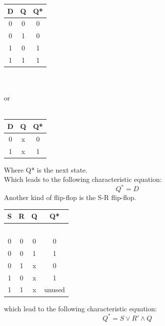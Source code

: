 \documentclass[nobib]{tufte-handout}
\begin{document}
    \begin{table}
        \centering
        \begin{tabular}{c c | c}
            D & Q & Q* \\
            \hline
            0 & 0 & 0  \\
            0 & 1 & 0  \\
            1 & 0 & 1  \\
            1 & 1 & 1
        \end{tabular}\\~\\
        or\\~\\
        \begin{tabular}{c c | c}
            D & Q & Q* \\
            \hline
            0 & x & 0  \\
            1 & x & 1
        \end{tabular}
    \end{table}
    Where Q* is the next state.\\
    Which leads to the following characteristic equation:
    \begin{equation*}
        Q^*=D
    \end{equation*}
    Another kind of flip-flop is the S-R flip-flop.
    \begin{table}
        \centering
        \begin{tabular}{c c c | c}
            S & R & Q & Q*     \\
            \hline~            \\\hline
            0 & 0 & 0 & 0      \\
            0 & 0 & 1 & 1      \\
            \hline
            0 & 1 & x & 0      \\
            \hline
            1 & 0 & x & 1      \\
            \hline
            1 & 1 & x & unused
        \end{tabular}
    \end{table}
    which lead to the following characteristic equation:
    \begin{equation*}
        Q^*=S\lor R' \land Q
    \end{equation*}
\end{document}
